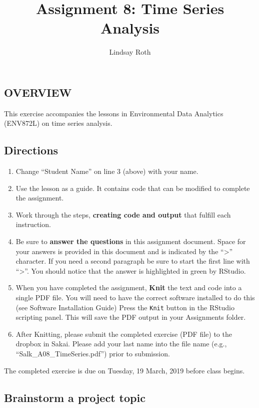 \documentclass[]{article}
\title{Assignment 8: Time Series Analysis}
\author{Lindsay Roth}
\date{}
\providecommand{\tightlist}{%
  \setlength{\itemsep}{0pt}\setlength{\parskip}{0pt}}
\begin{document}
\maketitle

\subsection{OVERVIEW}\label{overview}

This exercise accompanies the lessons in Environmental Data Analytics
(ENV872L) on time series analysis.

\subsection{Directions}\label{directions}

\begin{enumerate}
\def\labelenumi{\arabic{enumi}.}
\tightlist
\item
  Change ``Student Name'' on line 3 (above) with your name.
\item
  Use the lesson as a guide. It contains code that can be modified to
  complete the assignment.
\item
  Work through the steps, \textbf{creating code and output} that fulfill
  each instruction.
\item
  Be sure to \textbf{answer the questions} in this assignment document.
  Space for your answers is provided in this document and is indicated
  by the ``\textgreater{}'' character. If you need a second paragraph be
  sure to start the first line with ``\textgreater{}''. You should
  notice that the answer is highlighted in green by RStudio.
\item
  When you have completed the assignment, \textbf{Knit} the text and
  code into a single PDF file. You will need to have the correct
  software installed to do this (see Software Installation Guide) Press
  the \texttt{Knit} button in the RStudio scripting panel. This will
  save the PDF output in your Assignments folder.
\item
  After Knitting, please submit the completed exercise (PDF file) to the
  dropbox in Sakai. Please add your last name into the file name (e.g.,
  ``Salk\_A08\_TimeSeries.pdf'') prior to submission.
\end{enumerate}

The completed exercise is due on Tuesday, 19 March, 2019 before class
begins.

\subsection{Brainstorm a project
topic}\label{brainstorm-a-project-topic}
\end{document}
